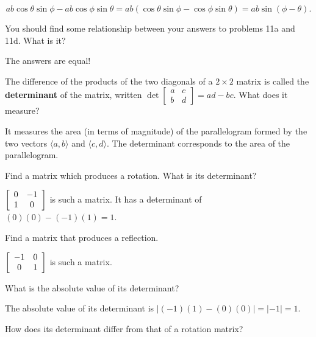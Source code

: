 \documentclass[../key.tex]{subfiles}
\begin{document}
$$ab\cos\theta\sin\phi - ab\cos\phi\sin\theta = ab(\cos\theta\sin\phi - \cos\phi\sin\theta) = ab\sin(\phi - \theta).$$

\begin{inner_problem}
\item You should find some relationship between your answers to problems 11a and 11d. What is it?
\end{inner_problem}

The answers are equal! 

\begin{inner_problem}
\item The difference of the products of the two diagonals of a $2\times 2$ matrix is called the \textbf{determinant} of the matrix, written $\det \left[\begin{smallmatrix}a & c \\ b & d \end{smallmatrix}\right]=ad-bc$. What does it measure?
\end{inner_problem}

It measures the area (in terms of magnitude) of the parallelogram formed by the two vectors $\langle a,b\rangle$ and $\langle c,d\rangle$. The determinant corresponds to the area of the parallelogram.

\begin{inner_problem}
\item Find a matrix which produces a rotation. What is its determinant?
\end{inner_problem}

$\left[\begin{array}{cc} 0 & -1 \\ 1 & 0 \end{array}\right]$ is such a matrix. It has a determinant of $(0)(0)-(-1)(1)=1$.

\begin{inner_problem}
\item Find a matrix that produces a reflection.
\end{inner_problem}

$\left[\begin{array}{cc} -1 & 0 \\ 0 & 1 \end{array}\right]$ is such a matrix.

\begin{iinner_problem}
\item What is the absolute value of its determinant?
\end{iinner_problem}

The absolute value of its determinant is $|(-1)(1)-(0)(0)|=|-1|=1$.

\begin{iinner_problem}
\item How does its determinant differ from that of a rotation matrix?
\end{iinner_problem}
\end{document}
